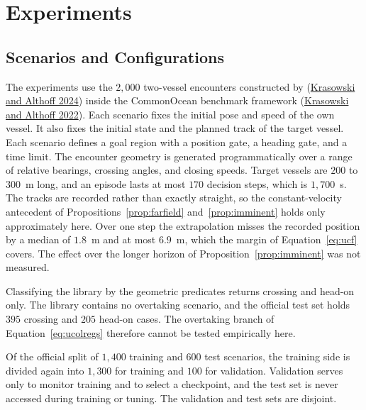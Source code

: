 \documentclass[10pt,letterpaper]{article}
\newcommand{\citl}[2]{(\hyperlink{ref:#1}{#2})}
\newcommand{\prov}[1]{#1}
\begin{document}
\section{Experiments}
\label{sec:exp}

\subsection{Scenarios and Configurations}
\label{sec:setup}

The experiments use the $2{,}000$ two-vessel encounters constructed by
\citl{krasowski2024}{Krasowski and Althoff 2024} inside the CommonOcean benchmark
framework \citl{krasowski2022}{Krasowski and Althoff 2022}. Each scenario fixes the
initial pose and speed of the own vessel. It also fixes the initial state and the
planned track of the target vessel. Each scenario defines a goal region with a position
gate, a heading gate, and a time limit. The encounter geometry is generated programmatically over a range
of relative bearings, crossing angles, and closing speeds. Target vessels are $200$ to $300$~m long, and an episode lasts at most $170$ decision
steps, which is $1{,}700$~s. The tracks are recorded rather than exactly straight, so the constant-velocity
antecedent of Propositions~\ref{prop:farfield} and~\ref{prop:imminent} holds only
approximately here. Over one step the extrapolation misses the recorded position by a median of $1.8$~m and
at most $6.9$~m, which the margin of Equation~\eqref{eq:ucf} covers. The effect over the
longer horizon of Proposition~\ref{prop:imminent} was not measured.

Classifying the library by the geometric predicates returns crossing and head-on only.
The library contains no overtaking scenario, and the official test set holds $395$
crossing and $205$ head-on cases. The overtaking branch of Equation~\eqref{eq:ucolregs}
therefore cannot be tested empirically here.

Of the official split of $1{,}400$ training and $600$ test scenarios, the training side
is divided again into $1{,}300$ for training and $100$ for validation. Validation serves
only to monitor training and to select a checkpoint, and the test set is never accessed
during training or tuning. The validation and test sets are disjoint.
\end{document}
